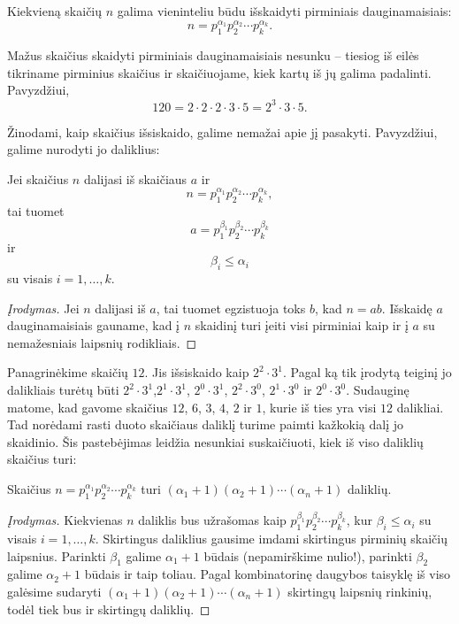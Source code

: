 \begin{teig} 
  Kiekvieną skaičių $n$ galima vieninteliu būdu išskaidyti
  pirminiais dauginamaisiais: $$n=p_1^{\alpha_1}p_2^{\alpha_2}\cdots
  p_k^{\alpha_k}.$$ 
\end{teig}

Mažus skaičius skaidyti pirminiais dauginamaisiais nesunku -- tiesiog iš eilės tikriname
pirminius skaičius ir skaičiuojame, kiek kartų iš jų galima padalinti.
Pavyzdžiui, $$120 = 2\cdot 2 \cdot 2 \cdot 3 \cdot 5 = 2^3\cdot 3 \cdot 5.$$

Žinodami, kaip skaičius išsiskaido, galime nemažai apie jį pasakyti.
Pavyzdžiui, galime nurodyti jo daliklius:

\begin{teig} Jei skaičius $n$ dalijasi iš skaičiaus $a$ ir
  $$n=p_1^{\alpha_1}p_2^{\alpha_2}\cdots p_k^{\alpha_k},$$ tai tuomet
  $$a=p_1^{\beta_1}p_2^{\beta_2}\cdots p_k^{\beta_k}$$ ir $$\beta_i \leq
  \alpha_i$$ su visais $i=1,\dots,k$.  
\end{teig}

\begin{proof}[Įrodymas] Jei $n$ dalijasi iš $a$, tai tuomet egzistuoja toks $b$,
  kad $n=ab$. Išskaidę $a$ dauginamaisiais gauname, kad į $n$ skaidinį turi 
  įeiti visi pirminiai kaip ir į $a$ su nemažesniais laipsnių rodikliais.
\end{proof}

Panagrinėkime skaičių $12$. Jis išsiskaido kaip $2^2\cdot 3^1$. Pagal ką
tik įrodytą teiginį jo dalikliais turėtų būti $2^2 \cdot 3^1$,$2^1 \cdot
3^1$, $2^0 \cdot 3^1$, $2^2 \cdot 3^0$, $2^1 \cdot 3^0$ ir $2^0 \cdot 3^0$.
Sudauginę matome, kad gavome skaičius $12$, $6$, $3$, $4$, $2$ ir $1$,
kurie iš ties yra visi $12$ dalikliai. 
Tad norėdami rasti duoto skaičiaus daliklį turime paimti kažkokią dalį jo
skaidinio. Šis pastebėjimas leidžia nesunkiai suskaičiuoti, kiek iš viso
daliklių skaičius turi:

\begin{teig} Skaičius $n = p_1^{\alpha_1}p_2^{\alpha_2}\cdots
  p_k^{\alpha_k}$ turi $(\alpha_1 + 1)(\alpha_2 + 1)\cdots (\alpha_n + 1)$
  daliklių.  
\end{teig}

\begin{proof}[Įrodymas] Kiekvienas $n$ daliklis bus užrašomas kaip
  $p_1^{\beta_1}p_2^{\beta_2}\cdots p_k^{\beta_k}$, kur $\beta_i \leq
  \alpha_i$ su visais $i=1,\dots,k$. Skirtingus daliklius gausime imdami
  skirtingus pirminių skaičių laipsnius. Parinkti $\beta_1$ galime $\alpha_1
  + 1$ būdais (nepamirškime nulio!), parinkti $\beta_2$ galime $\alpha_2 + 1$
  būdais ir taip toliau. Pagal kombinatorinę daugybos taisyklę iš viso
  galėsime sudaryti $(\alpha_1 + 1)(\alpha_2 + 1)\cdots (\alpha_n + 1)$
  skirtingų laipsnių rinkinių, todėl tiek bus ir skirtingų daliklių.
\end{proof}

